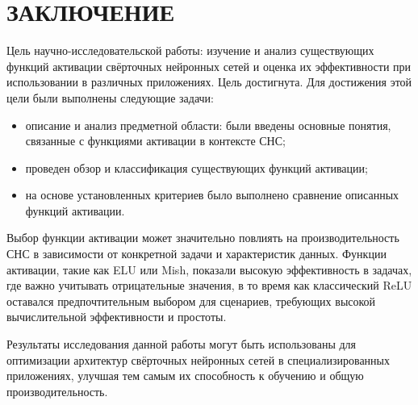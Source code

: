 \chapter*{ЗАКЛЮЧЕНИЕ}

Цель научно-исследовательской работы: изучение и анализ существующих функций активации свёрточных нейронных сетей и оценка их эффективности при использовании в различных приложениях. Цель достигнута. Для достижения этой цели были выполнены следующие задачи:

\begin{itemize}[label=---]
	\item описание и анализ предметной области: были введены основные понятия, связанные с функциями активации в контексте СНС;
	\item проведен обзор и классификация существующих функций активации;
	\item на основе установленных критериев было выполнено сравнение описанных функций активации.
\end{itemize}

Выбор функции активации может значительно повлиять на производительность СНС в зависимости от конкретной задачи и характеристик данных. Функции активации, такие как ELU или Mish, показали высокую эффективность в задачах, где важно учитывать отрицательные значения, в то время как классический ReLU оставался предпочтительным выбором для сценариев, требующих высокой вычислительной эффективности и простоты.

Результаты исследования данной работы могут быть использованы для оптимизации архитектур свёрточных нейронных сетей в специализированных приложениях, улучшая тем самым их способность к обучению и общую производительность.